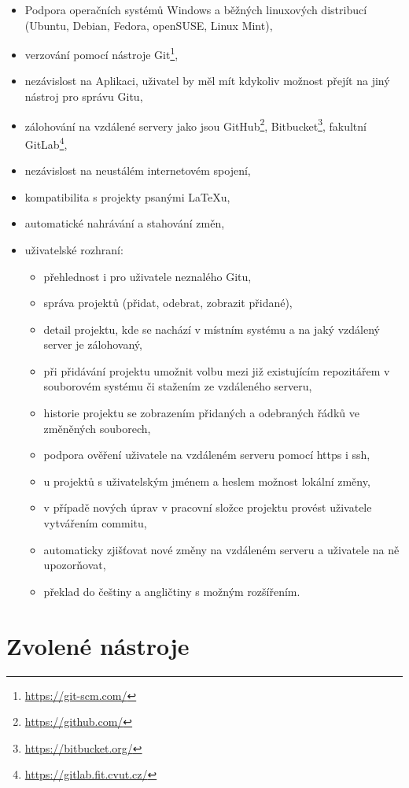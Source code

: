 \begin{itemize}
	\item Podpora operačních systémů Windows a běžných linuxových distribucí (Ubuntu, Debian, Fedora, openSUSE, Linux Mint),
	\item verzování pomocí nástroje Git\footnote{\url{https://git-scm.com/}},
	\item nezávislost na Aplikaci, uživatel by měl mít kdykoliv možnost přejít na jiný nástroj pro správu Gitu,
	\item zálohování na vzdálené servery jako jsou GitHub\footnote{\url{https://github.com/}}, Bitbucket\footnote{\url{https://bitbucket.org/}}, fakultní GitLab\footnote{\url{https://gitlab.fit.cvut.cz/}},
	\item nezávislost na neustálém internetovém spojení,
	\item kompatibilita s projekty psanými \LaTeX{u},
	\item automatické nahrávání a stahování změn,
	\item uživatelské rozhraní:
		\begin{itemize}
			\item přehlednost i pro uživatele neznalého Gitu,
			\item správa projektů (přidat, odebrat, zobrazit přidané),
			\item detail projektu, kde se nachází v místním systému a na jaký vzdálený server je zálohovaný,
			\item při přidávání projektu umožnit volbu mezi již existujícím repozitářem v souborovém systému či stažením ze vzdáleného serveru,
			\item historie projektu se zobrazením přidaných a odebraných řádků ve změněných souborech,
			\item podpora ověření uživatele na vzdáleném serveru pomocí https i ssh,
			\item u projektů s uživatelským jménem a heslem možnost lokální změny,
			\item v případě nových úprav v pracovní složce projektu provést uživatele vytvářením commitu,
			\item automaticky zjišťovat nové změny na vzdáleném serveru a uživatele na ně upozorňovat,
			\item překlad do češtiny a angličtiny s možným rozšířením.
		\end{itemize}
\end{itemize}


\section{Zvolené nástroje}

